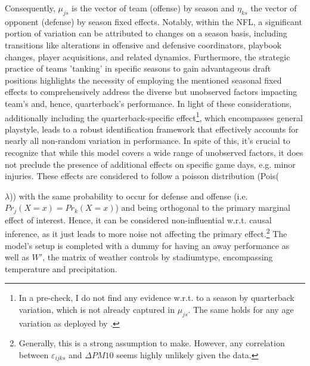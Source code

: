 \documentclass[12pt,a4paper]{article}
\begin{document}
Consequently, $\mu_{js}$ is the vector of team (offense) by season and $\eta_{ks}$ the vector of opponent (defense) by season fixed effects. Notably, within the NFL, a significant portion of variation can be attributed to changes on a season basis, including transitions like alterations in offensive and defensive coordinators, playbook changes, player acquisitions, and related dynamics. Furthermore, the strategic practice of teams 'tanking' in specific seasons to gain advantageous draft positions highlights the necessity of employing the mentioned seasonal fixed effects to comprehensively address the diverse but unobserved factors impacting team's and, hence, quarterback's performance. In light of these considerations, additionally including the quarterback-specific effect\footnote{In a pre-check, I do not find any evidence w.r.t. to a season by quarterback variation, which is not already captured in $\mu_{js}$. The same holds for any age variation as deployed by \citet{heintz2022}.}, which encompasses general playstyle, leads to a robust identification framework that effectively accounts for nearly all non-random variation in performance. In spite of this, it's crucial to recognize that while this model covers a wide range of unobserved factors, it does not preclude the presence of additional effects on specific game days, e.g. minor injuries. These effects are considered to follow a poisson distribution (Pois({$\lambda$)) with the same probability to occur for defense and offense (i.e. $Pr_j(X=x) = Pr_k(X=x)$) and being orthogonal to the primary marginal effect of interest. Hence, it can be considered non-influential w.r.t. causal inference, as it just leads to more noise not affecting the primary effect.\footnote{Generally, this is a strong assumption to make. However, any correlation between $\varepsilon_{ijks}$ and $\Delta PM10$ seems highly unlikely given the data.} The model's setup is completed with a dummy for having an away performance as well as ${W'}$, the matrix of weather controls by stadiumtype, encompassing temperature and precipitation.

}
\end{document}
